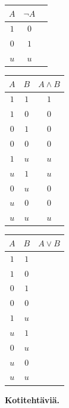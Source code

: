 \begin{enumerate}
\begin{center}
\begin{tabular}{|c|c|c|}\hline
$A$ & $\lnot A$ \\ \hline
$1$ & $0$ \\
$0$ & $1$ \\
$u$ & $u$ \\ \hline
\end{tabular}
\qquad
\begin{tabular}{|c|c|c|}\hline
$A$ & $B$ & $A\land B$\\ \hline
$1$ & $1$ & $1$\\
$1$ & $0$ & $0$\\
$0$ & $1$ & $0$\\
$0$ & $0$ & $0$\\
$1$ & $u$ & $u$\\
$u$ & $1$ & $u$\\
$0$ & $u$ & $0$\\
$u$ & $0$ & $0$\\
$u$ & $u$ & $u$\\ \hline
\end{tabular}
\qquad
\begin{tabular}{|c|c|c|}\hline
$A$ & $B$ & $A\lor B$\\ \hline
$1$ & $1$ & \\
$1$ & $0$ & \\
$0$ & $1$ & \\
$0$ & $0$ & \\
$1$ & $u$ & \\
$u$ & $1$ & \\
$0$ & $u$ & \\
$u$ & $0$ & \\
$u$ & $u$ & \\ \hline
\end{tabular}
\end{center}

\end{enumerate}

{\bf Kotitehtäviä.}

